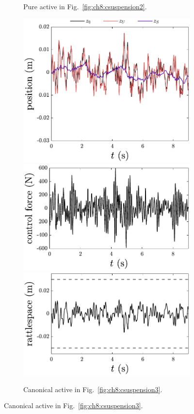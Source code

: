 \begin{figure}
\begin{subfigure}[b]{0.5\textwidth}
\caption{Pure active in Fig.~\ref{fig:ch8:csuspension2}.\label{fig:ch8:results2}}
\end{subfigure}%
\begin{subfigure}[b]{0.5\textwidth}
\centering
\includegraphics[width=\textwidth]{../ch8/figures/design1-position}
\includegraphics[width=\textwidth]{../ch8/figures/design1-control}
\includegraphics[width=\textwidth]{../ch8/figures/design1-rattlespace}
\caption{Canonical active in Fig.~\ref{fig:ch8:csuspension3}.\label{fig:ch8:results3}}
\end{subfigure}%


\end{figure}
